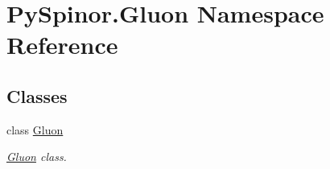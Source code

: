 \hypertarget{namespace_py_spinor_1_1_gluon}{}\section{Py\+Spinor.\+Gluon Namespace Reference}
\label{namespace_py_spinor_1_1_gluon}
\subsection*{Classes}
\begin{DoxyCompactItemize}
\item 
class \hyperlink{class_py_spinor_1_1_gluon_1_1_gluon}{Gluon}
\begin{DoxyCompactList}\small\item\em \hyperlink{class_py_spinor_1_1_gluon_1_1_gluon}{Gluon} class. \end{DoxyCompactList}\end{DoxyCompactItemize}
